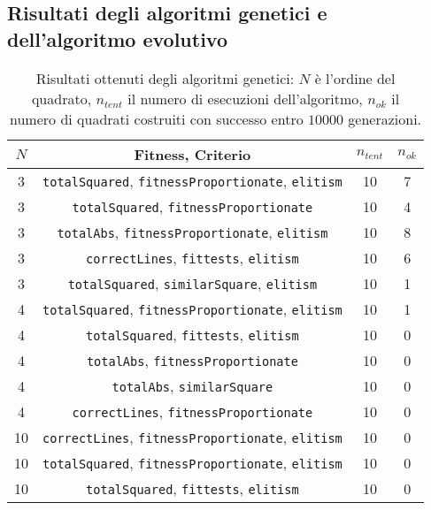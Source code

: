 \documentclass[italian,twoside,twocolumn]{article}
\begin{document}
\onecolumn

\subsection{Risultati degli algoritmi genetici e dell'algoritmo evolutivo}
\vspace*{-10pt}
\begin{table}[htbp]
	\centering	
		\caption{Risultati ottenuti degli algoritmi genetici: $ N $ è l'ordine del quadrato, $ n_{tent} $ il numero di esecuzioni dell'algoritmo, $ n_{ok} $ il numero di quadrati costruiti con successo entro $ \num{10000} $ generazioni.}
		\label{tab:risultati_genetic}	
		\begin{tabular}{cc|cc}
			\hline
			$ N $ &                           Fitness, Criterio                            & $ n_{tent} $ & $ n_{ok} $ \\ \hline
			  3   & \texttt{totalSquared}, \texttt{fitnessProportionate}, \texttt{elitism} &      10      &     7      \\
			  3   &          \texttt{totalSquared}, \texttt{fitnessProportionate}          &      10      &     4      \\
			  3   &   \texttt{totalAbs}, \texttt{fitnessProportionate}, \texttt{elitism}   &      10      &     8      \\
			  3   &       \texttt{correctLines}, \texttt{fittests}, \texttt{elitism}       &      10      &     6      \\
			  3   &    \texttt{totalSquared}, \texttt{similarSquare}, \texttt{elitism}     &      10      &     1      \\
			  4   & \texttt{totalSquared}, \texttt{fitnessProportionate}, \texttt{elitism} &      10      &     1      \\
			  4   &       \texttt{totalSquared}, \texttt{fittests}, \texttt{elitism}       &      10      &     0      \\
			  4   &            \texttt{totalAbs}, \texttt{fitnessProportionate}            &      10      &     0      \\
			  4   &               \texttt{totalAbs}, \texttt{similarSquare}                &      10      &     0      \\
			  4   &          \texttt{correctLines}, \texttt{fitnessProportionate}          &      10      &     0      \\
			 10   & \texttt{correctLines}, \texttt{fitnessProportionate}, \texttt{elitism} &      10      &     0      \\
			 10   & \texttt{totalSquared}, \texttt{fitnessProportionate}, \texttt{elitism} &      10      &     0      \\
			 10   &       \texttt{totalSquared}, \texttt{fittests}, \texttt{elitism}       &      10      &     0      \\ \hline
		\end{tabular} 	
\end{table}
\end{document}
